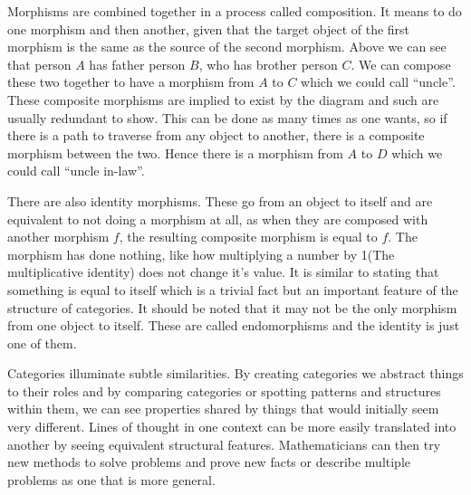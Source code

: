 \documentclass[10pt,a4paper,reqno]{amsart}
\numberwithin{figure}{section}
\begin{document}
Morphisms are combined together in a process called composition. It means to do
one morphism and then another, given that the target object of the first
morphism is the same as the source of the second morphism. Above we can see
that person $A$ has father person $B$, who has brother person $C$.  We can
compose these two together to have a morphism from $A$ to $C$ which we could
call ``uncle''. These composite morphisms are implied to exist by the diagram
and such are usually redundant to show. This can be done as many times as one
wants, so if there is a path to traverse from any object to another, there is a
composite morphism between the two. Hence there is a morphism from $A$ to $D$
which we could call ``uncle in-law''.

There are also identity morphisms. These go from an object to itself and are
equivalent to not doing a morphism at all, as when they are composed with
another morphism $f$, the resulting composite morphism is equal to $f$. The
morphism has done nothing, like how multiplying a number by 1(The multiplicative
identity) does not change it's value. It is similar to stating that something
is equal to itself which is a trivial fact but an important feature of the
structure of categories. It should be noted that it may not be the only
morphism from one object to itself. These are called endomorphisms and the
identity is just one of them.

Categories illuminate subtle similarities.
By creating categories we abstract things to their roles and by
comparing categories or spotting patterns and structures within them, we can see
properties shared by things that would initially seem very different. Lines of
thought in one context can be more easily translated into another by seeing
equivalent structural features. Mathematicians can then try new methods to
solve problems and prove new facts or describe multiple problems as one that is
more general.
\end{document}
